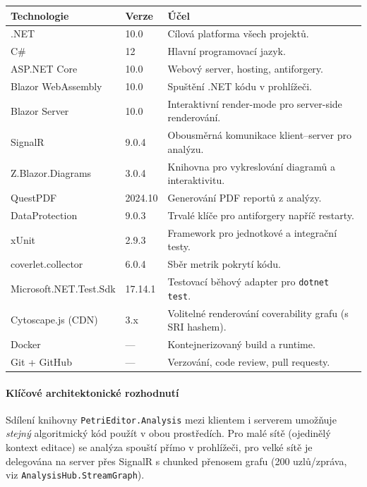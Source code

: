 \documentclass[12pt,a4paper]{article}
\begin{document}
\begin{longtable}{@{}p{4.6cm}p{1.8cm}p{7.0cm}@{}}
    \toprule
    \textbf{Technologie} & \textbf{Verze} & \textbf{Účel} \\
    \midrule
    \endhead
    .NET                     & 10.0    & Cílová platforma všech projektů. \\
    C\#                      & 12      & Hlavní programovací jazyk. \\
    ASP.NET Core             & 10.0    & Webový server, hosting, antiforgery. \\
    Blazor WebAssembly       & 10.0    & Spuštění .NET kódu v prohlížeči. \\
    Blazor Server            & 10.0    & Interaktivní render-mode pro server-side renderování. \\
    SignalR                  & 9.0.4   & Obousměrná komunikace klient–server pro analýzu. \\
    Z.Blazor.Diagrams        & 3.0.4   & Knihovna pro vykreslování diagramů a interaktivitu. \\
    QuestPDF                 & 2024.10 & Generování PDF reportů z analýzy. \\
    DataProtection           & 9.0.3   & Trvalé klíče pro antiforgery napříč restarty. \\
    xUnit                    & 2.9.3   & Framework pro jednotkové a integrační testy. \\
    coverlet.collector       & 6.0.4   & Sběr metrik pokrytí kódu. \\
    Microsoft.NET.Test.Sdk   & 17.14.1 & Testovací běhový adapter pro \texttt{dotnet test}. \\
    Cytoscape.js (CDN)       & 3.x     & Volitelné renderování coverability grafu (s SRI hashem). \\
    Docker                   & ---     & Kontejnerizovaný build a runtime. \\
    Git + GitHub             & ---     & Verzování, code review, pull requesty. \\
    \bottomrule
\end{longtable}

\paragraph{Klíčové architektonické rozhodnutí}
Sdílení knihovny \texttt{PetriEditor.Analysis} mezi klientem i serverem
umožňuje \emph{stejný} algoritmický kód použít v obou prostředích.
Pro malé sítě (ojedinělý kontext editace) se analýza spouští přímo
v prohlížeči, pro velké sítě je delegována na server přes SignalR
s chunked přenosem grafu (200 uzlů/zpráva, viz \texttt{AnalysisHub.StreamGraph}).
\end{document}
